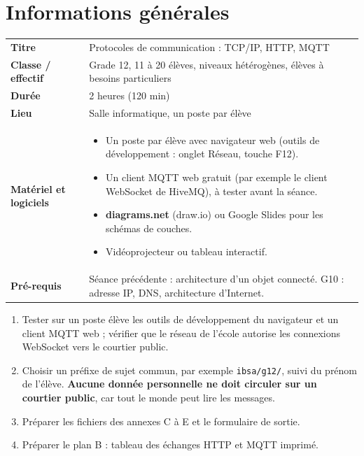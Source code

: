 \documentclass[11pt,a4paper]{article}
\begin{document}

\section{Informations générales}
\begin{tabularx}{\linewidth}{>{\bfseries}p{3.6cm}Y}
\toprule
Titre & Protocoles de communication : TCP/IP, HTTP, MQTT\\
Classe / effectif & Grade 12, 11 à 20 élèves, niveaux hétérogènes, élèves à besoins particuliers\\
Durée & 2 heures (120 min)\\
Lieu & Salle informatique, un poste par élève\\
Matériel et logiciels &
\begin{itemize}
 \item Un poste par élève avec navigateur web (outils de développement : onglet Réseau, touche F12).
 \item Un client MQTT web gratuit (par exemple le client WebSocket de HiveMQ), à tester avant la séance.
 \item \textbf{diagrams.net} (draw.io) ou Google Slides pour les schémas de couches.
 \item Vidéoprojecteur ou tableau interactif.
\end{itemize}\\
Pré-requis &
Séance précédente : architecture d'un objet connecté. G10 : adresse IP, DNS, architecture d'Internet.\\
\bottomrule
\end{tabularx}

\begin{astuce}
\begin{enumerate}
 \item Tester sur un poste élève les outils de développement du navigateur et un client MQTT web ; vérifier que le réseau de l'école autorise les connexions WebSocket vers le courtier public.
 \item Choisir un préfixe de sujet commun, par exemple \texttt{ibsa/g12/}, suivi du prénom de l'élève. \textbf{Aucune donnée personnelle ne doit circuler sur un courtier public}, car tout le monde peut lire les messages.
 \item Préparer les fichiers des annexes C à E et le formulaire de sortie.
 \item Préparer le plan B : tableau des échanges HTTP et MQTT imprimé.
\end{enumerate}
\end{astuce}
\end{document}
